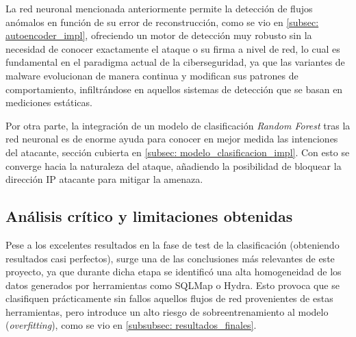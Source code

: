 \documentclass[12pt]{article}
\numberwithin{equation}{section} %
\begin{document}
    \vspace{5mm}

    La red neuronal mencionada anteriormente permite la detección de flujos anómalos en función de su error de reconstrucción, como se vio en \ref{subsec: autoencoder_impl}, ofreciendo un motor de detección muy robusto sin la necesidad de conocer exactamente el ataque o su firma a nivel de red, lo cual es fundamental en el paradigma actual de la ciberseguridad, ya que las variantes de malware evolucionan de manera continua y modifican sus patrones de comportamiento, infiltrándose en aquellos sistemas de detección que se basan en mediciones estáticas.

    \vspace{5mm}

    Por otra parte, la integración de un modelo de clasificación \textit{Random Forest} tras la red neuronal es de enorme ayuda para conocer en mejor medida las intenciones del atacante, sección cubierta en \ref{subsec: modelo_clasificacion_impl}. Con esto se converge hacia la naturaleza del ataque, añadiendo la posibilidad de bloquear la dirección IP atacante para mitigar la amenaza.

    \vspace{10mm}    

    \subsection{Análisis crítico y limitaciones obtenidas}

    \vspace{5mm}

    Pese a los excelentes resultados en la fase de test de la clasificación (obteniendo resultados casi perfectos), surge una de las conclusiones más relevantes de este proyecto, ya que durante dicha etapa se identificó una alta homogeneidad de los datos generados por herramientas como SQLMap o Hydra. Esto provoca que se clasifiquen prácticamente sin fallos aquellos flujos de red provenientes de estas herramientas, pero introduce un alto riesgo de sobreentrenamiento al modelo (\textit{overfitting}), como se vio en \ref{subsubsec: resultados_finales}.

    \vspace{5mm}
\end{document}
